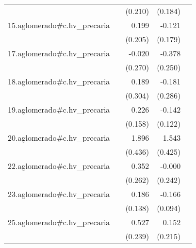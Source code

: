{\begin{longtable}{l*{4}{D{.}{.}{-1}}}
            &                     &     (0.210)         &     (0.184)         &                     \\
\addlinespace
15.aglomerado#c.hv\_precaria&                     &       0.199         &      -0.121         &                     \\
            &                     &     (0.205)         &     (0.179)         &                     \\
\addlinespace
17.aglomerado#c.hv\_precaria&                     &      -0.020         &      -0.378         &                     \\
            &                     &     (0.270)         &     (0.250)         &                     \\
\addlinespace
18.aglomerado#c.hv\_precaria&                     &       0.189         &      -0.181         &                     \\
            &                     &     (0.304)         &     (0.286)         &                     \\
\addlinespace
19.aglomerado#c.hv\_precaria&                     &       0.226         &      -0.142         &                     \\
            &                     &     (0.158)         &     (0.122)         &                     \\
\addlinespace
20.aglomerado#c.hv\_precaria&                     &       1.896\sym{***}&       1.543\sym{***}&                     \\
            &                     &     (0.436)         &     (0.425)         &                     \\
\addlinespace
22.aglomerado#c.hv\_precaria&                     &       0.352         &      -0.000         &                     \\
            &                     &     (0.262)         &     (0.242)         &                     \\
\addlinespace
23.aglomerado#c.hv\_precaria&                     &       0.186         &      -0.166         &                     \\
            &                     &     (0.138)         &     (0.094)         &                     \\
\addlinespace
25.aglomerado#c.hv\_precaria&                     &       0.527\sym{*}  &       0.152         &                     \\
            &                     &     (0.239)         &     (0.215)         &                     \\

\end{longtable}}
